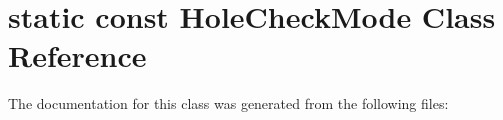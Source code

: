 \hypertarget{classstatic_01const_01HoleCheckMode}{}\section{static const Hole\+Check\+Mode Class Reference}
\label{classstatic_01const_01HoleCheckMode}


The documentation for this class was generated from the following files\+: